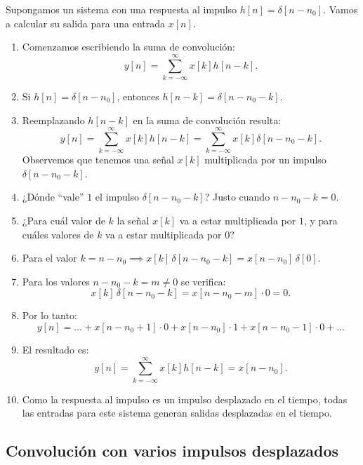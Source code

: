 \documentclass[11pt,a4paper,openany]{book}
\begin{document}
Supongamos un sistema con una respuesta al impulso $h[n] = \delta[n - n_{0}]$. Vamos a calcular su salida para una entrada $x[n]$.

\begin{enumerate}
	\item Comenzamos escribiendo la suma de convolución:
	\begin{equation}
		y[n] = \sum_{k=-\infty}^{\infty} x[k] h[n-k].
	\end{equation}
	\item Si $h[n] = \delta[n - n_{0}]$, entonces $h[n - k] = \delta[n - n_{0} - k]$.
	\item Reemplazando $h[n - k]$ en la suma de convolución resulta:
	\begin{equation}
		y[n] = \sum_{k=-\infty}^{\infty} x[k] h[n-k] = \sum_{k=-\infty}^{\infty} x[k] \delta[n - n_{0} - k].
	\end{equation}
	Observemos que tenemos una señal $x[k]$ multiplicada por un impulso $\delta[n - n_{0} - k]$.
	\item ¿Dónde ``vale'' $1$ el impulso $\delta[n - n_{0} - k]$? Justo cuando $n - n_{0} - k = 0$.
	\item ¿Para cuál valor de $k$ la señal $x[k]$ va a estar multiplicada por $1$, y para cuáles valores de $k$ va a estar multiplicada por $0$?
	\item Para el valor $k = n - n_{0} \implies x[k] \, \delta[n - n_{0} - k] = x[n - n_{0}] \, \delta[0]$.
	\item Para los valores $n - n_{0} - k = m \neq 0$ se verifica:
	\begin{equation}
		x[k] \, \delta[n - n_{0} - k] = x[n - n_{0} - m] \cdot 0 = 0.
	\end{equation}
	\item Por lo tanto:
	\begin{equation}
		y[n] = \dots + x[n - n_{0} + 1] \cdot 0 + x[n - n_{0}] \cdot 1 + x[n - n_{0} - 1] \cdot 0 + \dots 
	\end{equation}
	\item El resultado es:
	\begin{equation}
		y[n] = \sum_{k=-\infty}^{\infty} x[k] h[n-k] = x[n - n_{0}].
	\end{equation}
	\item Como la respuesta al impulso es un impulso desplazado en el tiempo, todas las entradas para este sistema generan salidas desplazadas en el tiempo.
\end{enumerate}

\subsection{Convolución con varios impulsos desplazados}
\end{document}
